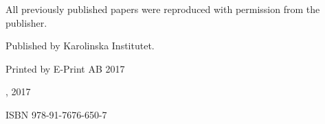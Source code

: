 
\vspace*{\fill}

\noindent All previously published papers were reproduced with permission from the publisher.

\noindent Published by Karolinska Institutet.

\noindent Printed by E-Print AB 2017

\noindent \textcopyright \thesisauthor, 2017

\noindent ISBN 978-91-7676-650-7
\thispagestyle{empty}

\newpage

\restoregeometry